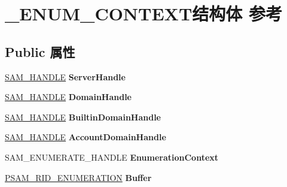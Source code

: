 \hypertarget{struct___e_n_u_m___c_o_n_t_e_x_t}{}\section{\+\_\+\+E\+N\+U\+M\+\_\+\+C\+O\+N\+T\+E\+X\+T结构体 参考}
\label{struct___e_n_u_m___c_o_n_t_e_x_t}
\subsection*{Public 属性}
\begin{DoxyCompactItemize}
\item 
\mbox{\label{struct___e_n_u_m___c_o_n_t_e_x_t_a8c55cbc74c06ec52bf36dc1443b5dd1e}} 
\hyperlink{interfacevoid}{S\+A\+M\+\_\+\+H\+A\+N\+D\+LE} {\bfseries Server\+Handle}
\item 
\mbox{\label{struct___e_n_u_m___c_o_n_t_e_x_t_afb928f05c80a87ac9e6a751870e01ff7}} 
\hyperlink{interfacevoid}{S\+A\+M\+\_\+\+H\+A\+N\+D\+LE} {\bfseries Domain\+Handle}
\item 
\mbox{\label{struct___e_n_u_m___c_o_n_t_e_x_t_a2317fdaabb1b6a187c88a49bfcd39afa}} 
\hyperlink{interfacevoid}{S\+A\+M\+\_\+\+H\+A\+N\+D\+LE} {\bfseries Builtin\+Domain\+Handle}
\item 
\mbox{\label{struct___e_n_u_m___c_o_n_t_e_x_t_a6dd8572e78f095bad1dc8eac9f177217}} 
\hyperlink{interfacevoid}{S\+A\+M\+\_\+\+H\+A\+N\+D\+LE} {\bfseries Account\+Domain\+Handle}
\item 
\mbox{\label{struct___e_n_u_m___c_o_n_t_e_x_t_a90388c3d9f9acba458c3c5cd7b805176}} 
S\+A\+M\+\_\+\+E\+N\+U\+M\+E\+R\+A\+T\+E\+\_\+\+H\+A\+N\+D\+LE {\bfseries Enumeration\+Context}
\item 
\mbox{\label{struct___e_n_u_m___c_o_n_t_e_x_t_ab80b6e048046a8501913d62cf42d0442}} 
\hyperlink{struct___s_a_m___r_i_d___e_n_u_m_e_r_a_t_i_o_n}{P\+S\+A\+M\+\_\+\+R\+I\+D\+\_\+\+E\+N\+U\+M\+E\+R\+A\+T\+I\+ON} {\bfseries Buffer}
\item 
\mbox{\label{struct___e_n_u_m___c_o_n_t_e_x_t_a03f8a391d50305584d5ac768c68add68}} 

\end{DoxyCompactItemize}
